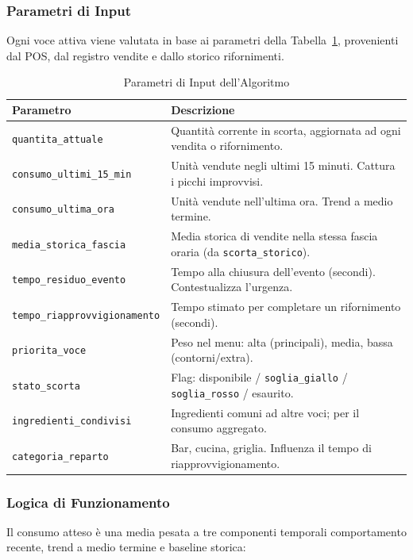 \subsubsection*{Parametri di Input}
Ogni voce attiva viene valutata in base ai parametri della Tabella~\ref{tab:parametri_input}, provenienti dal POS, dal registro vendite e dallo storico rifornimenti.

\begin{table}[htbp]
\centering
\caption{Parametri di Input dell'Algoritmo}
\label{tab:parametri_input}
\small
\begin{tabular}{lp{10cm}}
\toprule
\textbf{Parametro} & \textbf{Descrizione} \\
\midrule
\texttt{quantita\_attuale} & Quantità corrente in scorta, aggiornata ad ogni vendita o rifornimento. \\
\texttt{consumo\_ultimi\_15\_min} & Unità vendute negli ultimi 15 minuti. Cattura i picchi improvvisi. \\
\texttt{consumo\_ultima\_ora} & Unità vendute nell'ultima ora. Trend a medio termine. \\
\texttt{media\_storica\_fascia} & Media storica di vendite nella stessa fascia oraria (da \texttt{scorta\_storico}). \\
\texttt{tempo\_residuo\_evento} & Tempo alla chiusura dell'evento (secondi). Contestualizza l'urgenza. \\
\texttt{tempo\_riapprovvigionamento} & Tempo stimato per completare un rifornimento (secondi). \\
\texttt{priorita\_voce} & Peso nel menu: alta (principali), media, bassa (contorni/extra). \\
\texttt{stato\_scorta} & Flag: disponibile / \texttt{soglia\_giallo} / \texttt{soglia\_rosso} / esaurito. \\
\texttt{ingredienti\_condivisi} & Ingredienti comuni ad altre voci; per il consumo aggregato. \\
\texttt{categoria\_reparto} & Bar, cucina, griglia. Influenza il tempo di riapprovvigionamento. \\
\bottomrule
\end{tabular}
\end{table}

\subsubsection*{Logica di Funzionamento}
Il consumo atteso è una media pesata a tre componenti temporali  comportamento recente, trend a medio termine e baseline storica:

